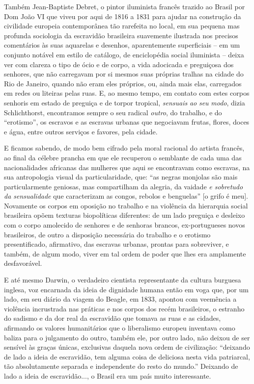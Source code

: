 Também Jean-Baptiste Debret, o pintor iluminista francês trazido ao
Brasil por Dom João VI que viveu por aqui de 1816 a 1831 para ajudar na
construção da civilidade europeia contemporânea tão rarefeita no local,
em sua pequena mas profunda sociologia da escravidão brasileira
suavemente ilustrada nos precisos comentários às suas aquarelas e
desenhos, aparentemente superficiais -- em um conjunto notável em estilo
de catálogo, de enciclopédia social iluminista -- deixa ver com clareza
o tipo de ócio e de corpo, a vida adocicada e preguiçosa dos senhores,
que não carregavam por si mesmos suas próprias tralhas na cidade do Rio
de Janeiro, quando não eram eles próprios, ou, ainda mais elas,
carregados em redes ou liteiras pelas ruas. E, ao mesmo tempo, em
contato com estes corpos senhoris em estado de preguiça e de torpor
tropical, \emph{sensuais} \emph{ao} \emph{seu} \emph{modo}, dizia
Schlichthorst, encontramos sempre o seu radical \emph{outro}, do
trabalho, e do ``erotismo'', os escravos e as escravas urbanas que
negociavam frutas, flores, doces e água, entre outros serviços e
favores, pela cidade.

E ficamos sabendo, de modo bem cifrado pela moral racional do artista
francês, ao final da célebre prancha em que ele recuperou o semblante de
cada uma das nacionalidades africanas das mulheres que aqui se
encontravam como escravas, na sua antropologia visual da
particularidade, que: ``as negras monjolas são mais particularmente
geniosas, mas compartilham da alegria, da vaidade \emph{e sobretudo da
sensualidade} que caracterizam as congos, rebolos e benguelas'' {[}o
grifo é meu{]}. Novamente os corpos em oposição no trabalho e na
violência da hierarquia social brasileira opõem texturas biopolíticas
diferentes: de um lado preguiça e desleixo com o corpo amolecido de
senhores e de senhoras brancos, ex-portugueses novos brasileiros, de
outro a disposição necessária do trabalho e o erotismo presentificado,
afirmativo, das escravas urbanas, prontas para sobreviver, e também, de
algum modo, viver em tal ordem de poder que lhes era amplamente
desfavorável.

E até mesmo Darwin, o verdadeiro cientista representante da cultura
burguesa inglesa, voz encarnada da ideia de dignidade humana então em
voga que, por um lado, em seu diário da viagem do Beagle, em 1833,
apontou com veemência a violência incrustrada nas práticas e nos corpos
dos recém brasileiros, o estranho do sadismo e da dor real da escravidão
que tomava as ruas e as cidades, afirmando os valores humanitários que o
liberalismo europeu inventava como baliza para o julgamento do outro,
também ele, por outro lado, não deixou de ser sensível às graças únicas,
exclusivas daquela nova ordem de civilização: ``deixando de lado a ideia
de escravidão, tem alguma coisa de deliciosa nesta vida patriarcal, tão
absolutamente separada e independente do resto do mundo.'' Deixando de
lado a ideia de escravidão..., o Brasil era um país muito interessante.


